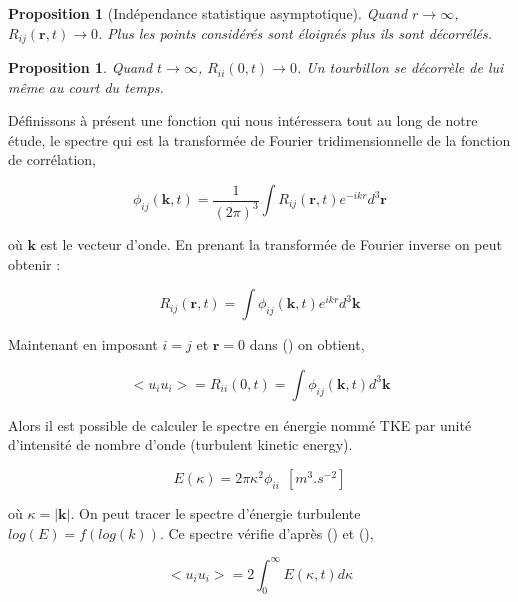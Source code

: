 \documentclass[12pt]{article}
\theoremstyle{plain}
\newtheorem{proposition}[theorem]{Proposition}
\theoremstyle{remark}
\begin{document}
		\begin{proposition}[Indépendance statistique asymptotique]
			Quand $r\rightarrow\infty$, $R_{ij}(\textbf{r},t)\rightarrow0$. Plus les points considérés sont éloignés plus ils sont décorrélés.
		\end{proposition}
	
		\begin{proposition}
			Quand $t\rightarrow\infty$, $R_{ii}(0,t)\rightarrow0$. Un tourbillon se décorrèle de lui même au court du temps.
		\end{proposition}
	
		Définissons à présent une fonction qui nous intéressera tout au long de notre étude, le spectre qui est la transformée de Fourier tridimensionnelle de la fonction de corrélation,
		
		\begin{equation}
			\phi_{ij}(\textbf{k}, t) = \frac{1}{(2\pi)^3}\int R_{ij}(\textbf{r},t)e^{-ikr}d^3\textbf{r}
		\end{equation}
	 
	
		où $\textbf{k}$ est le vecteur d'onde. En prenant la transformée de Fourier inverse on peut obtenir :
		
		\begin{equation}
			R_{ij}(\textbf{r}, t) = \int \phi_{ij}(\textbf{k},t)e^{ikr}d^3\textbf{k}
			\label{spectra_space}
		\end{equation}
		
		Maintenant en imposant $i=j$ et $\textbf{r}=0$ dans () on obtient, 
		
		\begin{equation}
			<u_iu_i>=R_{ii}(0,t)=\int \phi_{ij}(\textbf{k},t)d^3\textbf{k}
			\label{verif}
		\end{equation}
	
		Alors il est possible de calculer le spectre en énergie nommé TKE par unité d'intensité de nombre d'onde (turbulent kinetic energy). 
		
		\begin{equation}
			E(\kappa)=2\pi \kappa^2\phi_{ii}~~[m^{3}.s^{-2}]
			\label{energie_spectra}
		\end{equation}
	
		où $\kappa = |\textbf{k}|$. On peut tracer le spectre d'énergie turbulente $log(E)=f(log(k))$. Ce spectre vérifie d'après () et (),
		
		\begin{equation}
			<u_iu_i>=2\int_{0}^{\infty}E(\kappa,t)d\kappa
		\end{equation}
	
\end{document}
